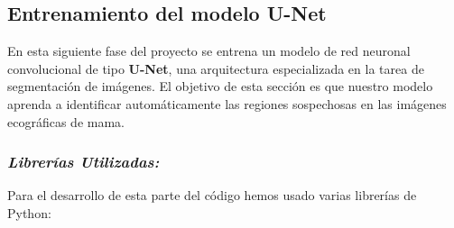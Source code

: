 \documentclass[12pt]{article}
\begin{document}
\subsection{Entrenamiento del modelo U-Net}
En esta siguiente fase del proyecto se entrena un modelo de red neuronal convolucional de tipo \textbf{U-Net}, una arquitectura especializada en la tarea de segmentación de imágenes. El objetivo de esta sección es que nuestro modelo aprenda a identificar automáticamente las regiones sospechosas en las imágenes ecográficas de mama.

\subsubsection{\textit{Librerías Utilizadas:}}
Para el desarrollo de esta parte del código hemos usado varias librerías de Python:
\end{document}
